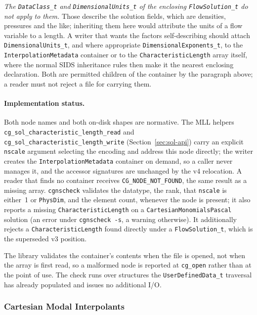 \documentclass[11pt,letterpaper]{article}
\newif\ifvfourdraft
\newcommand{\vfourmark}{\ifvfourdraft\textcolor{v4violet}{\textbf{[v4]}}\ \fi}
\begin{document}
\emph{The \texttt{DataClass\_t} and \texttt{DimensionalUnits\_t} of the enclosing
\texttt{FlowSolution\_t} do not apply to them.}  Those describe the solution
fields, which are densities, pressures and the like; inheriting them here would
attribute the units of a flow variable to a length.  A writer that wants the
factors self-describing should attach \texttt{DimensionalUnits\_t}, and where
appropriate \texttt{DimensionalExponents\_t}, to the
\texttt{InterpolationMetadata} container or to the \texttt{CharacteristicLength}
array itself, where the normal SIDS inheritance rules then make it the nearest
enclosing declaration.  Both are permitted children of the container by the
paragraph above; a reader must not reject a file for carrying them.

\paragraph{Implementation status.}
Both node names and both on-disk shapes are normative.  The MLL helpers
\texttt{cg\_sol\_characteristic\_length\_read} and
\texttt{cg\_sol\_characteristic\_length\_write} (Section~\ref{sec:sol-api}) carry an
explicit \texttt{nscale} argument selecting the encoding and address this node
directly; \vfourmark the writer creates the \texttt{InterpolationMetadata}
container on demand, so a caller never manages it, and the accessor signatures are
unchanged by the v4 relocation.  A reader that finds no container receives
\texttt{CG\_NODE\_NOT\_FOUND}, the same result as a missing array.
\texttt{cgnscheck} validates the datatype, the rank, that \texttt{nscale} is
either~1 or \texttt{PhysDim}, and the element count, whenever the node is present; it
also reports a missing \texttt{CharacteristicLength} on a \texttt{CartesianMonomialsPascal}
solution (an error under \texttt{cgnscheck -s}, a warning otherwise).
\vfourmark It additionally rejects a \texttt{CharacteristicLength} found directly
under a \texttt{FlowSolution\_t}, which is the superseded v3 position.

\vfourmark The library validates the container's contents when the file is opened,
not when the array is first read, so a malformed node is reported at
\texttt{cg\_open} rather than at the point of use.  The check runs over structures
the \texttt{UserDefinedData\_t} traversal has already populated and issues no
additional I/O.

\subsubsection{Cartesian Modal Interpolants}
\end{document}

